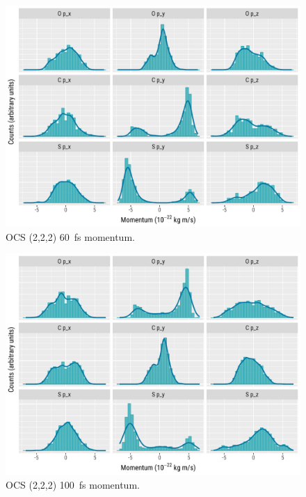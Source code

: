 \begin{figure}
  \centering
  \includegraphics[width=\textwidth]{Plots/OCS22260fsMomentum}
  \caption[OCS (2,2,2) \SI{60}{\fs} momentum.]
  {OCS (2,2,2) \SI{60}{\fs} momentum.}
  \label{fig:OCS22260fsMomentum}
\end{figure}

\begin{figure}
  \centering
  \includegraphics[width=\textwidth]{Plots/OCS222100fsMomentum}
  \caption[OCS (2,2,2) \SI{100}{\fs} momentum.]
  {OCS (2,2,2) \SI{100}{\fs} momentum.}
  \label{fig:OCS222100fsMomentum}
\end{figure}

